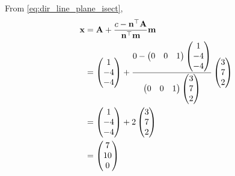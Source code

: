 \documentclass[journal,12pt,twocolumn]{IEEEtran}
\renewcommand\thesection{\arabic{section}}
\begin{document}
\begin{enumerate}[label=\thesection.\arabic*.,ref=\thesection.\theenumi]
From 
	\eqref{eq:dir_line_plane_isect},
\begin{align}
	\mathbf{x} &= \mathbf{A} + \frac{c - \mathbf{n}^{\top}\mathbf{A}}{\mathbf{n}^{\top}\mathbf{m}}
\mathbf{m}
	\\
	&= \begin{pmatrix}1 \\ -4 \\ -4\end{pmatrix} + \frac{0 - \begin{pmatrix}0 & 0 &1\end{pmatrix}\begin{pmatrix}1 \\ -4 \\ -4\end{pmatrix}}{\begin{pmatrix}0 & 0 &1\end{pmatrix}\begin{pmatrix}3 \\ 7 \\ 2\end{pmatrix}}\begin{pmatrix}3 \\ 7 \\ 2\end{pmatrix}
	\\
	&=\begin{pmatrix}1 \\ -4 \\ -4\end{pmatrix}+2\begin{pmatrix}3 \\ 7 \\ 2\end{pmatrix}
	\\
	&=\begin{pmatrix}7 \\ 10 \\ 0\end{pmatrix}
\end{align}


\end{enumerate}
\end{document}
